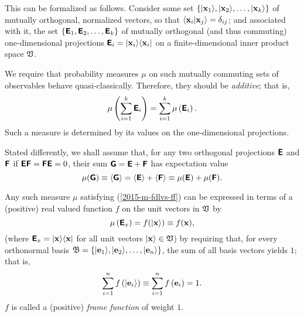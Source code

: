 This can be formalized as follows.
Consider some set
 $
\{
\vert {\bf x}_1 \rangle ,
\vert {\bf x}_2 \rangle ,
\ldots ,
\vert {\bf x}_k \rangle
\}
$
of mutually orthogonal, normalized vectors,
so that $ \langle {\bf x}_i \vert {\bf x}_j \rangle =\delta_{ij}$;
and associated with it,
the set
 $
\{
\textsf{\textbf{E}}_1,
\textsf{\textbf{E}}_2,
\ldots ,
\textsf{\textbf{E}}_k
\}
$
of mutually orthogonal (and thus commuting) one-dimensional projections
$\textsf{\textbf{E}}_i= \vert {\bf x}_i \rangle \langle {\bf x}_i \vert$
on a finite-dimensional inner product space   ${\frak V}$.

We require that probability measures $\mu$ on such mutually commuting sets of observables behave quasi-classically.
Therefore, they
should be {\em additive}; that is,
\begin{equation}
\mu \left(\sum_{i=1}^k \textsf{\textbf{E}}_i \right)= \sum_{i=1}^k \mu \left(\textsf{\textbf{E}}_i \right)
.
\label{2015-m-fdlvs-ff}
\end{equation}
Such a measure is determined by its values on the one-dimensional projections.

Stated differently, we shall assume that,
for any two orthogonal projections $ \textsf{\textbf{E}}$ and $\textsf{\textbf{F}}$
if
 $ \textsf{\textbf{E}}\textsf{\textbf{F}}= \textsf{\textbf{F}}\textsf{\textbf{E}}=0$,
their sum
 $  \textsf{\textbf{G}} =\textsf{\textbf{E}}+\textsf{\textbf{F}}$
has expectation value
\begin{equation}
\mu ( \textsf{\textbf{G}} ) \equiv
\langle \textsf{\textbf{G}}\rangle =
\langle \textsf{\textbf{E}} \rangle +
\langle \textsf{\textbf{F}} \rangle
\equiv
\mu  ( \textsf{\textbf{E}} ) +
\mu  ( \textsf{\textbf{F}} )
.
\end{equation}

Any such measure $\mu $ satisfying (\ref{2015-m-fdlvs-ff})
can be expressed in terms of a (positive) real valued function $f$ on the unit vectors in  ${\frak V}$
by
\begin{equation}
\mu \left( \textsf{\textbf{E}}_x \right)=
f( \vert {\bf x} \rangle )
\equiv f(  {\bf x}  )
,
\label{2015-m-fdlvs-ffmuf}
\end{equation}
(where $\textsf{\textbf{E}}_x= \vert {\bf x}  \rangle \langle {\bf x}  \vert$ for all  unit vectors $\vert {\bf x}  \rangle \in {\frak V}$)
by requiring that,
for every orthonormal basis
${\frak B} =\{
\vert {\bf e}_1 \rangle ,
\vert {\bf e}_2 \rangle ,
\ldots ,
\vert {\bf e}_n \rangle
\}$,  the sum of all basis vectors yields $1$; that is,
\begin{equation}
\sum_{i=1}^n f \left( \vert {\bf e}_i \rangle \right)
\equiv
\sum_{i=1}^n f \left(   {\bf e}_i  \right)
=1
.
\label{2015-m-fdlvs-ff2}
\end{equation}
$f$ is called a (positive) {\em frame function} of weight $1$.

